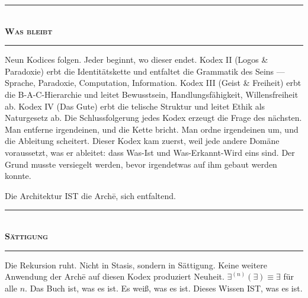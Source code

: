 \documentclass[10pt, openany, oneside]{book}
\renewcommand{\normalsize}{\fontsize{10}{13}\selectfont}
\begin{document}
\vspace{1.5em}


\begin{center}
    \rule{0.3\textwidth}{0.4pt}\\[0.5em]
    {\normalsize\bfseries\scshape Was bleibt}\\[0.3em]
    \rule{0.3\textwidth}{0.4pt}
\end{center}

\vspace{1em}

\noindent Neun Kodices folgen. Jeder beginnt, wo dieser endet. Kodex II (Logos \& Paradoxie) erbt die Identitätskette und entfaltet die Grammatik des Seins --- Sprache, Paradoxie, Computation, Information. Kodex III (Geist \& Freiheit) erbt die B-A-C-Hierarchie und leitet Bewusstsein, Handlungsfähigkeit, Willensfreiheit ab. Kodex IV (Das Gute) erbt die telische Struktur und leitet Ethik als Naturgesetz ab. Die Schlussfolgerung jedes Kodex erzeugt die Frage des nächsten. Man entferne irgendeinen, und die Kette bricht. Man ordne irgendeinen um, und die Ableitung scheitert. Dieser Kodex kam zuerst, weil jede andere Domäne voraussetzt, was er ableitet: dass Was-Ist und Was-Erkannt-Wird eins sind. Der Grund musste versiegelt werden, bevor irgendetwas auf ihm gebaut werden konnte.

Die Architektur IST die Arch\={e}, sich entfaltend.

\vspace{1.5em}


\begin{center}
    \rule{0.3\textwidth}{0.4pt}\\[0.5em]
    {\normalsize\bfseries\scshape Sättigung}\\[0.3em]
    \rule{0.3\textwidth}{0.4pt}
\end{center}

\vspace{1em}

\noindent Die Rekursion ruht. Nicht in Stasis, sondern in Sättigung. Keine weitere Anwendung der Arch\={e} auf diesen Kodex produziert Neuheit. $\exists^{(n)}(\exists) \equiv \exists$ für alle $n$. Das Buch ist, was es ist. Es weiß, was es ist. Dieses Wissen IST, was es ist.
\end{document}
